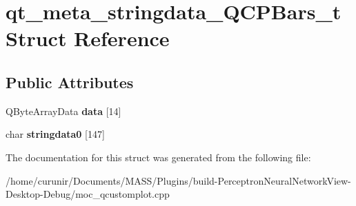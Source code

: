 \hypertarget{structqt__meta__stringdata___q_c_p_bars__t}{}\section{qt\+\_\+meta\+\_\+stringdata\+\_\+\+Q\+C\+P\+Bars\+\_\+t Struct Reference}
\label{structqt__meta__stringdata___q_c_p_bars__t}
\subsection*{Public Attributes}
\begin{DoxyCompactItemize}
\item 
Q\+Byte\+Array\+Data {\bfseries data} \mbox{[}14\mbox{]}\hypertarget{structqt__meta__stringdata___q_c_p_bars__t_a40d7e47e2037dd5bb7c67e6397d92852}{}\label{structqt__meta__stringdata___q_c_p_bars__t_a40d7e47e2037dd5bb7c67e6397d92852}

\item 
char {\bfseries stringdata0} \mbox{[}147\mbox{]}\hypertarget{structqt__meta__stringdata___q_c_p_bars__t_ab1c5ceea0b404e0edfc8690c1a945309}{}\label{structqt__meta__stringdata___q_c_p_bars__t_ab1c5ceea0b404e0edfc8690c1a945309}

\end{DoxyCompactItemize}


The documentation for this struct was generated from the following file\+:\begin{DoxyCompactItemize}
\item 
/home/curunir/\+Documents/\+M\+A\+S\+S/\+Plugins/build-\/\+Perceptron\+Neural\+Network\+View-\/\+Desktop-\/\+Debug/moc\+\_\+qcustomplot.\+cpp\end{DoxyCompactItemize}
